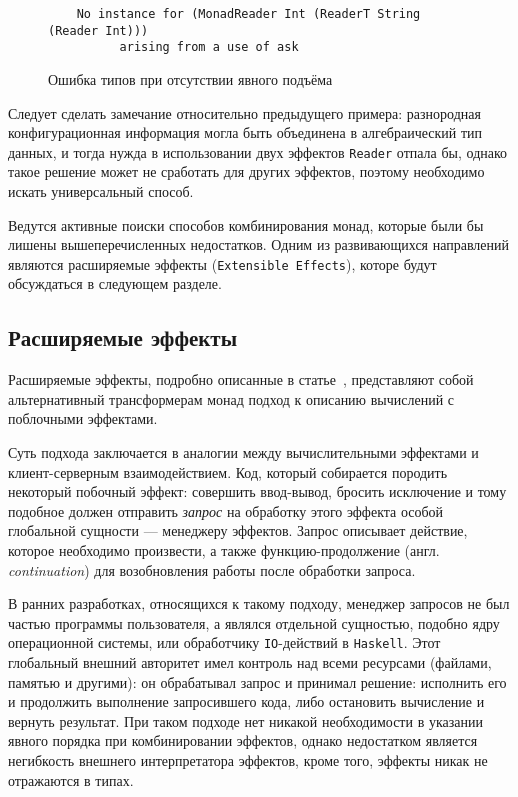     \begin{figure}[t]
    \begin{lstlisting}
    No instance for (MonadReader Int (ReaderT String (Reader Int)))
          arising from a use of ask
    \end{lstlisting}
    \caption{Ошибка типов при отсутствии явного подъёма}
    \label{listing:mtlCompileError}
    \end{figure}

    Следует сделать замечание относительно предыдущего примера: разнородная
    конфигурационная информация могла быть объединена в алгебраический тип данных,
    и тогда нужда в использовании двух эффектов \lstinline{Reader} отпала бы,
    однако такое решение может не сработать для других эффектов, поэтому необходимо
    искать универсальный способ.

    Ведутся активные поиски способов комбинирования монад, которые были бы лишены
    вышеперечисленных недостатков. Одним из развивающихся направлений являются
    расширяемые эффекты (\lstinline{Extensible Effects}), которе будут обсуждаться
    в следующем разделе.

  \subsection{Расширяемые эффекты}

    Расширяемые эффекты, подробно описанные в статье~\cite{extEffects}, представляют
    собой альтернативный трансформерам монад подход к описанию вычислений с поблочными
    эффектами.

    Суть подхода заключается в аналогии между вычислительными эффектами и
    клиент-серверным взаимодействием. Код, который собирается породить некоторый
    побочный эффект: совершить ввод-вывод, бросить исключение и тому подобное должен
    отправить \emph{запрос} на обработку этого эффекта особой глобальной сущности
    --- менеджеру эффектов. Запрос описывает действие, которое необходимо
    произвести, а также функцию-продолжение (англ. \emph{continuation}) для
    возобновления работы после обработки запроса.

    В ранних разработках, относящихся к такому подходу, менеджер запросов не был
    частью программы пользователя, а являлся отдельной сущностью, подобно ядру
    операционной системы, или обработчику \lstinline{IO}-действий в
    \lstinline{Haskell}. Этот глобальный внешний авторитет имел контроль над всеми
    ресурсами (файлами, памятью и другими): он обрабатывал запрос и принимал решение:
    исполнить его и продолжить выполнение запросившего кода, либо остановить
    вычисление и вернуть результат. При таком подходе нет никакой необходимости в
    указании явного порядка при комбинировании эффектов, однако недостатком является
    негибкость внешнего интерпретатора эффектов, кроме того, эффекты никак
    не отражаются в типах.

